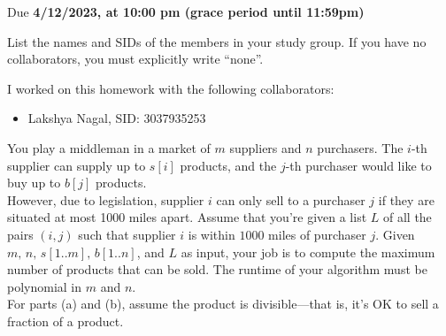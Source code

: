 \documentclass[11pt]{article}
\def\duedate{4/12/2023, at 10:00 pm (grace period until 11:59pm)}
\begin{document}
\maketitle

Due \textbf{\duedate}

List the names and SIDs of the members in your study group.
If you have no collaborators, you must explicitly write ``none''.

\begin{solution} I worked on this homework with the following collaborators:
\begin{itemize}
    \item Lakshya Nagal, SID: 3037935253
\end{itemize}
\end{solution}

You play a middleman in a market of $m$ suppliers
and $n$ purchasers.
The $i$-th supplier can supply up to $s[i]$ products,
and the $j$-th purchaser would like to buy up to $b[j]$ products.\\

\noindent However, due to legislation, supplier $i$ can only sell  to a purchaser $j$ if they
are situated at most 1000 miles apart.
Assume that you're given a list $L$ of all the pairs $(i,j)$ such that
supplier $i$ is within $1000$ miles of purchaser $j$.
Given $m, \, n,\, s[1..m], \, b[1..n]$, and $L$ as input,
your job is to compute the maximum number of products that can be 
sold.
The runtime of your algorithm must be polynomial in $m$ and $n$.\\

\noindent For parts (a) and (b), assume the product is divisible—that is, it's OK to sell a fraction of a product. 
\end{document}
